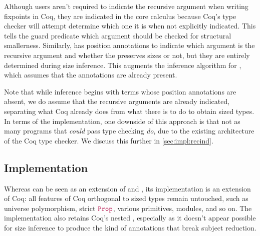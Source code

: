 Although users aren't required to indicate the recursive argument when writing fixpoints in Coq,
they are indicated in the core calculus because Coq's type checker will attempt determine which one it is when not explicitly indicated.
This tells the guard predicate which argument should be checked for structural smallerness.
Similarly, \lang has position annotations to indicate which argument is the recursive argument and whether the \cofixpoint preserves sizes or not,
but they are entirely determined during size inference.
This augments the inference algorithm for \CIChat,
which assumes that the annotations are already present.

Note that while inference begins with terms whose position annotations are absent,
we do assume that the recursive arguments are already indicated,
separating what Coq already does from what there is to do to obtain sized types.
In terms of the implementation, one downside of this approach is that not as many programs that \emph{could} pass type checking \emph{do},
due to the existing architecture of the Coq type checker.
We discuss this further in \autoref{sec:impl:recind}.
\fi

\subsection{Implementation}

Whereas \lang can be seen as an extension of \CIChat and \CChatomega,
its implementation is an extension of Coq:
all features of Coq orthogonal to sized types remain untouched,
such as universe polymorphism, strict $\Prop$, various primitives, modules, and so on.
The implementation also retains Coq's nested \coinductives,
especially as it doesn't appear possible for size inference to produce the kind of annotations that break subject reduction.

